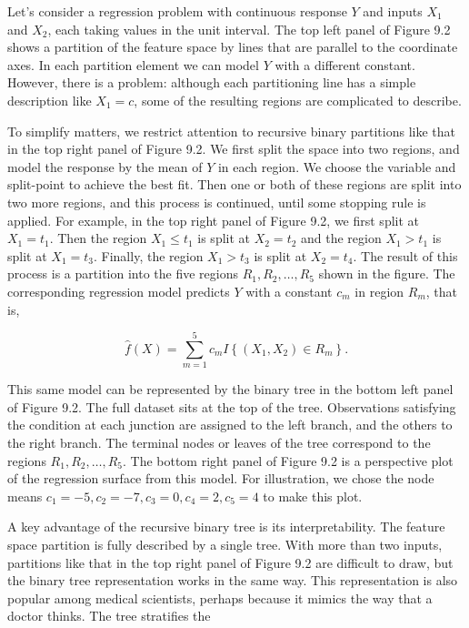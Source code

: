 \documentclass[10pt]{article}
\begin{document}
Let's consider a regression problem with continuous response $Y$ and inputs $X_{1}$ and $X_{2}$, each taking values in the unit interval. The top left panel of Figure 9.2 shows a partition of the feature space by lines that are parallel to the coordinate axes. In each partition element we can model $Y$ with a different constant. However, there is a problem: although each partitioning line has a simple description like $X_{1}=c$, some of the resulting regions are complicated to describe.

To simplify matters, we restrict attention to recursive binary partitions like that in the top right panel of Figure 9.2. We first split the space into two regions, and model the response by the mean of $Y$ in each region. We choose the variable and split-point to achieve the best fit. Then one or both of these regions are split into two more regions, and this process is continued, until some stopping rule is applied. For example, in the top right panel of Figure 9.2, we first split at $X_{1}=t_{1}$. Then the region $X_{1} \leq t_{1}$ is split at $X_{2}=t_{2}$ and the region $X_{1}>t_{1}$ is split at $X_{1}=t_{3}$. Finally, the region $X_{1}>t_{3}$ is split at $X_{2}=t_{4}$. The result of this process is a partition into the five regions $R_{1}, R_{2}, \ldots, R_{5}$ shown in the figure. The corresponding regression model predicts $Y$ with a constant $c_{m}$ in region $R_{m}$, that is,


\begin{equation*}
\hat{f}(X)=\sum_{m=1}^{5} c_{m} I\left\{\left(X_{1}, X_{2}\right) \in R_{m}\right\} . \tag{9.9}
\end{equation*}


This same model can be represented by the binary tree in the bottom left panel of Figure 9.2. The full dataset sits at the top of the tree. Observations satisfying the condition at each junction are assigned to the left branch, and the others to the right branch. The terminal nodes or leaves of the tree correspond to the regions $R_{1}, R_{2}, \ldots, R_{5}$. The bottom right panel of Figure 9.2 is a perspective plot of the regression surface from this model. For illustration, we chose the node means $c_{1}=-5, c_{2}=-7, c_{3}=0, c_{4}= 2, c_{5}=4$ to make this plot.

A key advantage of the recursive binary tree is its interpretability. The feature space partition is fully described by a single tree. With more than two inputs, partitions like that in the top right panel of Figure 9.2 are difficult to draw, but the binary tree representation works in the same way. This representation is also popular among medical scientists, perhaps because it mimics the way that a doctor thinks. The tree stratifies the
\end{document}
